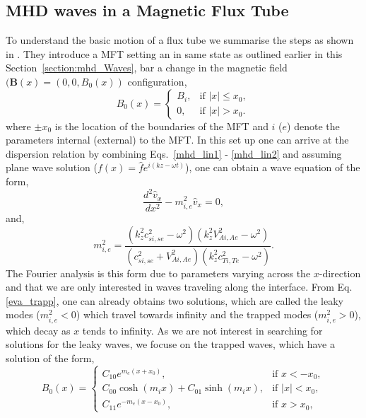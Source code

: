 \documentclass[12pt]{ociamthesis}
\newcommand{\bs}[1]{\boldsymbol{#1}}
\newcommand{\eref}[1]{Eq. \eqref{#1}}
\begin{document}
\subsection{MHD waves in a Magnetic Flux Tube}
\label{section:Tan_I}
To understand the basic motion of a flux tube we summarise the steps as shown in \cite{Roberts1981SoPh6939R}. They introduce a MFT setting an in same state as outlined earlier in this Section~\ref{section:mhd_Waves}, bar a change in the magnetic field $(\bs{B}(x)=(0,0,B_0(x))$ configuration,
\begin{equation}
    B_0(x) = 
    \begin{cases}
      B_i, & \text{if } |x| \leq x_0, \\
      0, & \text{if } |x| > x_0.
    \end{cases}
\end{equation}
where $\pm x_0$ is the location of the boundaries of the MFT and $i$ ($e$) denote the parameters internal (external) to the MFT. In this set up one can arrive at the dispersion relation by combining Eqs.~\eqref{mhd_lin1} - \eqref{mhd_lin2} and assuming plane wave solution ($f(x)=\hat{f} e^{i(kz-\omega t)}$), one can obtain a wave equation of the form,
\begin{equation}
    \frac{d^2 \hat{v}_x}{dx^2}-m^2_{i,e} \hat{v}_x = 0,
\end{equation}
and,
\begin{equation}\label{eva_trapp}
    m_{i,e}^2 = \frac{(k_z^2 c_{si,se}^2-\omega^2)(k_z^2 V_{Ai,Ae}^2-\omega^2)}{(c_{si,se}^2+V_{Ai,Ae}^2)(k_z^2 c_{Ti,Te}^2-\omega^2)}.
\end{equation}
The Fourier analysis is this form due to parameters varying across the $x$-direction and that we are only interested in waves traveling along the interface. From \eref{eva_trapp}, one can already obtains two solutions, which are called the leaky modes ($m^2_{i,e}<0$) which travel towards infinity and the trapped modes ($m^2_{i,e}>0$), which decay as $x$ tends to infinity. As we are not interest in searching for solutions for the leaky waves, we focuse on the trapped waves, which have a solution of the form,
\begin{equation}
        B_0(x) = 
    \begin{cases}
      C_{10} e^{m_e (x+x_0)}, &  \text{if } x < -x_0, \\
      C_{00} \cosh{(m_i x)} + C_{01} \sinh{(m_i x)}, & \text{if } |x| < x_0, \\
      C_{11} e^{-m_e(x-x_0)}, & \text{if } x > x_0,
    \end{cases}
\end{equation}
\end{document}
